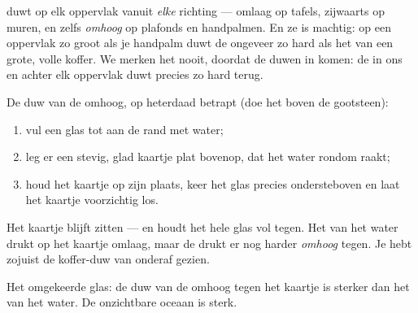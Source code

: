 \begin{proposition}\label{prop:g5:air-pressure-weather:allsides}
 duwt op elk oppervlak vanuit \emph{elke} richting ---
omlaag op tafels, zijwaarts op muren, en zelfs \emph{omhoog} op
plafonds en handpalmen. En ze is machtig: op een oppervlak zo groot
als je handpalm duwt de  ongeveer zo hard als het  van
een grote, volle koffer. We merken het nooit, doordat de duwen in
 komen: de  in ons en achter elk oppervlak duwt precies
zo hard terug.
\end{proposition}

\begin{method}\label{met:g5:air-pressure-weather:card}
De duw van de  omhoog, op heterdaad betrapt (doe het boven de
gootsteen):
\begin{enumerate}
  \item vul een glas tot aan de rand met water;
  \item leg er een stevig, glad kaartje plat bovenop, dat het water
        rondom raakt;
  \item houd het kaartje op zijn plaats, keer het glas precies
        ondersteboven en laat het kaartje voorzichtig los.
\end{enumerate}
Het kaartje blijft zitten --- en houdt het hele glas vol tegen. Het
 van het water drukt op het kaartje omlaag, maar de
 drukt er nog harder \emph{omhoog} tegen. Je hebt zojuist
de koffer-duw van onderaf gezien.
\end{method}

\begin{omfigure}

{\small Het omgekeerde glas: de duw van de  omhoog tegen het
kaartje is sterker dan het  van het water. De onzichtbare oceaan
is sterk.}
\end{omfigure}

